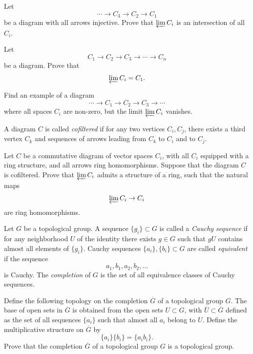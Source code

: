 \begin{exercise}
\label{exercise-inverse-limit-intersection}
Let
$$
\cdots \to C_3 \to C_2 \to C_1
$$
be a diagram with all arrows injective.
Prove that $\varprojlim C_i$ is an
intersection of all $C_i$.
\end{exercise}

\begin{exercise}
\label{exercise-inverse-limit-initial-object}
Let
$$
C_1 \to C_2 \to C_3 \to \cdots \to C_n
$$
be a diagram. Prove that
$$
\varprojlim C_i=C_1.
$$
\end{exercise}

\begin{exercise}
\label{exercise-nonzero-diagram-zero-limit}
Find an example of a diagram
$$
\cdots \to C_1 \to C_2 \to C_3 \to
\cdots
$$
where all spaces $C_i$ are non-zero,
but the limit $\varprojlim C_i$
vanishes.
\end{exercise}

\begin{definition}
\label{definition-cofiltered-diagram}
A diagram $C$ is called
{\it cofiltered} if for any two
vertices $C_i,C_j$, there exists a
third vertex $C_k$ and sequences of
arrows leading from $C_k$ to $C_i$
and to $C_j$.
\end{definition}

\begin{exercise}
\label{exercise-inverse-limit-ring}
Let $C$ be a commutative diagram of
vector spaces $C_i$, with all $C_i$
equipped with a ring structure, and all
arrows ring homomorphisms. Suppose that
the diagram $C$ is cofiltered. Prove
that $\varprojlim C_i$ admits a
structure of a ring, such that the
natural maps
$$
\varprojlim C_i \to C_i
$$
are ring homomorphisms.
\end{exercise}

\begin{definition}
\label{definition-completion-topological-group}
Let $G$ be a topological group. A
sequence $\{g_i\}\subset G$ is called
a {\it Cauchy sequence} if for any
neighborhood $U$ of the identity there
exists $g \in G$ such that $gU$
contains almost all elements of
$\{g_i\}$. Cauchy sequences
$\{a_i\},\{b_i\}\subset G$ are called
{\it equivalent} if the sequence
$$
a_1,b_1,a_2,b_2,\ldots
$$
is Cauchy. The {\it completion} of
$G$ is the set of all equivalence
classes of Cauchy sequences.
\end{definition}

\begin{exercise}
\label{exercise-topological-group-completion}
Define the following topology on the
completion $\overline G$ of a
topological group $G$. The base of open
sets in $\overline G$ is obtained from
the open sets $U \subset G$, with
$\overline U \subset \overline G$
defined as the set of all sequences
$\{a_i\}$ such that almost all $a_i$
belong to $U$. Define the
multiplicative structure on
$\overline G$ by
$$
\{a_i\}\{b_i\}=\{a_ib_i\}.
$$
Prove that the completion
$\overline G$ of a topological group
$G$ is a topological group.
\end{exercise}

